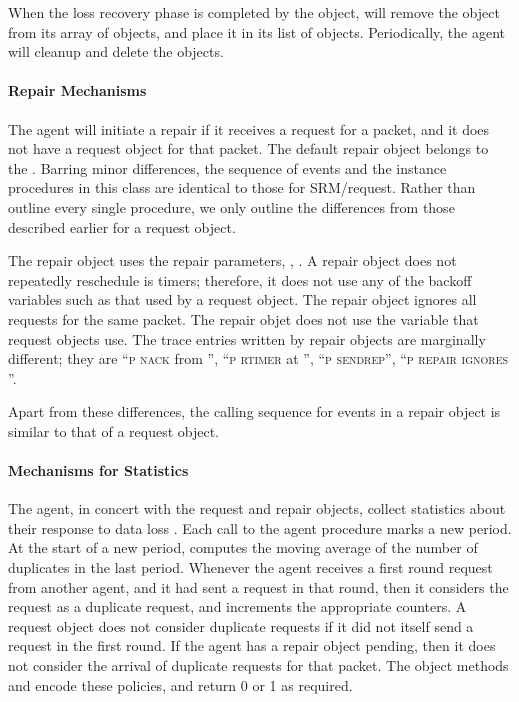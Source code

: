 {When the loss recovery phase is completed by the object,
will remove the object from its array of  objects,
and place it in its list of  objects.
Periodically, the agent will cleanup and delete the  objects.

\paragraph{Repair Mechanisms}
The agent will initiate a repair if it receives a request for a packet,
and it does not have a request object  for that packet.
The default repair object belongs to the
.
Barring minor differences,
the sequence of events and the instance procedures in this class
are identical to those for SRM/request.
Rather than outline every single procedure, we only outline
the differences from those described earlier for a request object.

The repair object uses the repair parameters, , .
A repair object does not repeatedly reschedule is timers;
therefore, it does not use any of the backoff variables
such as that used by a request object.
The repair object ignores all requests for the same packet.
The repair objet does not use the  variable that
request objects use.
The trace entries written by repair objects are marginally different;
they are ``\textsc{p nack } from '',
``\textsc{p rtimer } at '',
``\textsc{p sendrep}'', ``\textsc{p repair ignores } ''.

Apart from these differences,
the calling sequence for events in a repair object is similar to that
of a request object.

\paragraph{Mechanisms for Statistics}
The agent, in concert with the request and repair objects, 
collect statistics about their response to data loss \cite{Floy95:Reliable}.
Each call to the agent  procedure marks a new period.
At the start of a new period,
computes the moving average of the number of duplicates in the last period.
Whenever the agent receives a first round request from another agent,
and it had sent a request in that round, then it considers the request
as a duplicate request, and increments the appropriate counters.
A request object does not consider duplicate requests if it did not
itself send a request in the first round. 
If the agent has a repair object pending, then it does not consider
the arrival of duplicate requests for that packet.
The object methods
 and
encode these policies, and return 0 or 1 as required.

}
